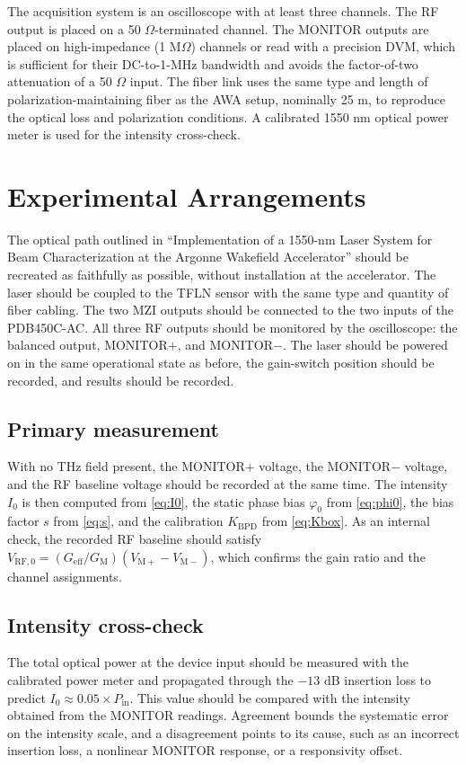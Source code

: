 \documentclass[11pt]{article}
\newcommand{\Iz}{I_{0}}
\newcommand{\phz}{\varphi_{0}}
\newcommand{\Vp}{V_{\mathrm{M+}}}
\newcommand{\Vm}{V_{\mathrm{M-}}}
\begin{document}
The acquisition system is an oscilloscope with at least three channels. The RF output is
placed on a 50 $\Omega$-terminated channel. The MONITOR outputs are placed on
high-impedance (1 M$\Omega$) channels or read with a precision DVM, which is sufficient
for their DC-to-1-MHz bandwidth and avoids the factor-of-two attenuation of a 50 $\Omega$
input. The fiber link uses the same type and length of polarization-maintaining fiber as
the AWA setup, nominally 25 m, to reproduce the optical loss and polarization
conditions. A calibrated 1550 nm optical power meter is used for the intensity
cross-check.

\section{Experimental Arrangements}

The optical path outlined in ``Implementation of a 1550-nm Laser System for Beam
Characterization at the Argonne Wakefield Accelerator'' should be recreated as
faithfully as possible, without installation at the accelerator. The laser should be
coupled to the TFLN sensor with the same type and quantity of fiber cabling. The two MZI
outputs should be connected to the two inputs of the PDB450C-AC. All three RF outputs
should be monitored by the oscilloscope: the balanced output, MONITOR$+$, and
MONITOR$-$. The laser should be powered on in the same operational state as before, the
gain-switch position should be recorded, and results should be recorded.

\subsection{Primary measurement}
With no THz field present, the MONITOR$+$ voltage, the MONITOR$-$ voltage, and the RF
baseline voltage should be recorded at the same time. The intensity $\Iz$ is then
computed from \eqref{eq:I0}, the static phase bias $\phz$ from \eqref{eq:phi0}, the bias
factor $s$ from \eqref{eq:s}, and the calibration $K_{\mathrm{BPD}}$ from
\eqref{eq:Kbox}. As an internal check, the recorded RF baseline should satisfy
$V_{\mathrm{RF,0}} = (G_{\mathrm{eff}}/G_{\mathrm{M}})(\Vp-\Vm)$, which confirms the gain
ratio and the channel assignments.

\subsection{Intensity cross-check}
The total optical power at the device input should be measured with the calibrated power
meter and propagated through the $-13$ dB insertion loss to predict
$\Iz \approx 0.05 \times P_{\mathrm{in}}$. This value should be compared with the
intensity obtained from the MONITOR readings. Agreement bounds the systematic error on
the intensity scale, and a disagreement points to its cause, such as an incorrect
insertion loss, a nonlinear MONITOR response, or a responsivity offset.
\end{document}
